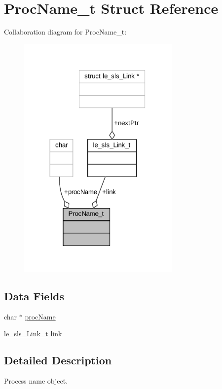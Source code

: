 \hypertarget{struct_proc_name__t}{}\section{Proc\+Name\+\_\+t Struct Reference}
\label{struct_proc_name__t}


Collaboration diagram for Proc\+Name\+\_\+t\+:
\nopagebreak
\begin{figure}[H]
\begin{center}
\leavevmode
\includegraphics[width=225pt]{struct_proc_name__t__coll__graph}
\end{center}
\end{figure}
\subsection*{Data Fields}
\begin{DoxyCompactItemize}
\item 
char $\ast$ \hyperlink{struct_proc_name__t_ab41b4e9205e9255cbba3638c59c0157b}{proc\+Name}
\item 
\hyperlink{structle__sls___link__t}{le\+\_\+sls\+\_\+\+Link\+\_\+t} \hyperlink{struct_proc_name__t_a93b8469b828a15859cd0cf105f48b3c2}{link}
\end{DoxyCompactItemize}


\subsection{Detailed Description}
Process name object. 

